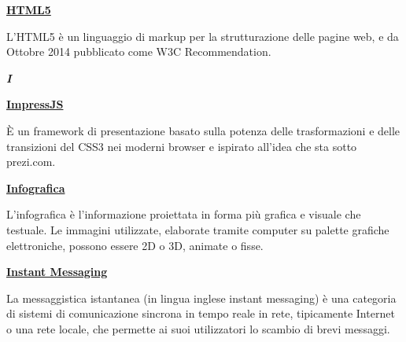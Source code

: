 \bigskip
\begin{addmargin}[0em]{0em}	
	\textbf{\underline{HTML5}}
\end{addmargin}

\medskip
\begin{addmargin}[5em]{1em}	
L'HTML5 è un linguaggio di markup per la strutturazione delle pagine web, e da Ottobre 2014 pubblicato come W3C Recommendation.
\end{addmargin}	

\newpage

\cleardoublepage
{}
{}
\noindent\hrulefill\hspace{4mm}\textbf{\textsl{\Huge{I}}}\hspace{4mm}\hrulefill

\vspace*{2\bigskipamount}

\begin{addmargin}[0em]{0em}	
	\textbf{\underline{ImpressJS}}
\end{addmargin}

\medskip
\begin{addmargin}[5em]{1em}	
	È un framework di presentazione basato sulla potenza delle trasformazioni e delle transizioni del CSS3 nei moderni browser e ispirato all'idea che sta sotto prezi.com.
\end{addmargin}	

\bigskip
\begin{addmargin}[0em]{0em}	
	\textbf{\underline{Infografica}}
\end{addmargin}

\medskip
\begin{addmargin}[5em]{1em}		
	L'infografica è l'informazione proiettata in forma più grafica e visuale che testuale. Le immagini utilizzate, elaborate tramite computer su palette grafiche elettroniche, possono essere 2D o 3D, animate o fisse.
\end{addmargin}	

\bigskip
\begin{addmargin}[0em]{0em}		
	\textbf{\underline{Instant Messaging}}
\end{addmargin}

\medskip
\begin{addmargin}[5em]{1em}	
La messaggistica istantanea (in lingua inglese instant messaging) è una categoria di sistemi di comunicazione sincrona in tempo reale in rete, tipicamente Internet o una rete locale, che permette ai suoi utilizzatori lo scambio di brevi messaggi.
\end{addmargin}	

